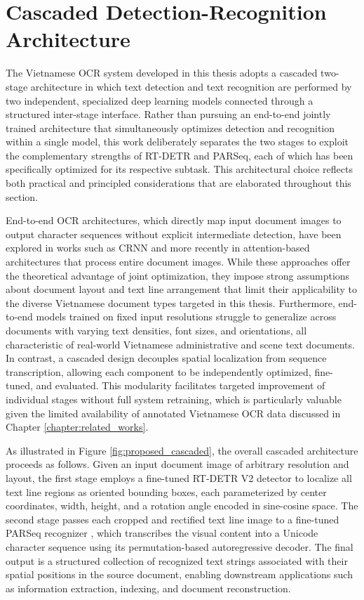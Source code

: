 \section{Cascaded Detection-Recognition Architecture}
\label{sec:proposed_cascaded_deep_learning_architecture_overview_3_1}
The Vietnamese OCR system developed in this thesis adopts a cascaded two-stage architecture in which text detection and text recognition are performed by two independent, specialized deep learning models connected through a structured inter-stage interface. Rather than pursuing an end-to-end jointly trained architecture that simultaneously optimizes detection and recognition within a single model, this work deliberately separates the two stages to exploit the complementary strengths of RT-DETR and PARSeq, each of which has been specifically optimized for its respective subtask. This architectural choice reflects both practical and principled considerations that are elaborated throughout this section.

End-to-end OCR architectures, which directly map input document images to output character sequences without explicit intermediate detection, have been explored in works such as CRNN \cite{Shi2015} and more recently in attention-based architectures that process entire document images. While these approaches offer the theoretical advantage of joint optimization, they impose strong assumptions about document layout and text line arrangement that limit their applicability to the diverse Vietnamese document types targeted in this thesis. Furthermore, end-to-end models trained on fixed input resolutions struggle to generalize across documents with varying text densities, font sizes, and orientations, all characteristic of real-world Vietnamese administrative and scene text documents. In contrast, a cascaded design decouples spatial localization from sequence transcription, allowing each component to be independently optimized, fine-tuned, and evaluated. This modularity facilitates targeted improvement of individual stages without full system retraining, which is particularly valuable given the limited availability of annotated Vietnamese OCR data discussed in Chapter \ref{chapter:related_works}.

As illustrated in Figure \ref{fig:proposed_cascaded}, the overall cascaded architecture proceeds as follows. Given an input document image of arbitrary resolution and layout, the first stage employs a fine-tuned RT-DETR V2 detector \cite{Zhao2024} to localize all text line regions as oriented bounding boxes, each parameterized by center coordinates, width, height, and a rotation angle encoded in sine-cosine space. The second stage passes each cropped and rectified text line image to a fine-tuned PARSeq recognizer \cite{Bautista2022}, which transcribes the visual content into a Unicode character sequence using its permutation-based autoregressive decoder. The final output is a structured collection of recognized text strings associated with their spatial positions in the source document, enabling downstream applications such as information extraction, indexing, and document reconstruction.


